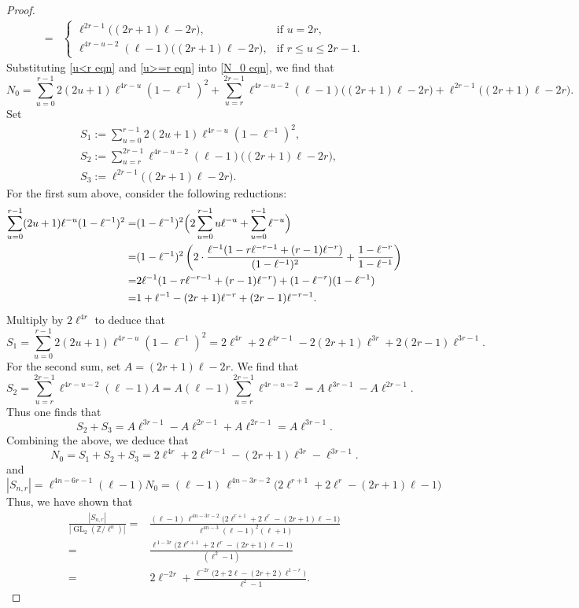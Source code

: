\documentclass[10pt,a4paper]{amsart}
\newcommand{\op}[1]{\operatorname{#1}}
\begin{document}
\begin{proof}
\begin{equation}
\begin{split}
=&\begin{cases}
\ell^{2r-1}\big((2r+1)\ell-2r\big), & \text{if }u=2r,\\
\ell^{4r-u-2}(\ell-1)\big((2r+1)\ell-2r\big), & \text{if }r\le u\le 2r-1.
\end{cases}
\end{split}
\end{equation}
Substituting \eqref{u<r eqn} and \eqref{u>=r eqn} into \eqref{N_0 eqn}, we find that
\[N_0=\sum_{u=0}^{r-1}2(2u+1) \ell^{4r-u}\left(1-\ell^{-1}\right)^2+\sum_{u=r}^{2r-1}\ell^{4r-u-2}(\ell-1)\big((2r+1)\ell-2r\big)+\ell^{2r-1}\big((2r+1)\ell-2r\big).\]
\noindent Set 
\[\begin{split}
&S_1:=\sum_{u=0}^{r-1}2(2u+1) \ell^{4r-u}\left(1-\ell^{-1}\right)^2,\\
&S_2:=\sum_{u=r}^{2r-1}\ell^{4r-u-2}(\ell-1)\big((2r+1)\ell-2r\big),\\
&S_3:=\ell^{2r-1}\big((2r+1)\ell-2r\big).
\end{split}\]
For the first sum above, consider the following reductions:
\[
\begin{split}\sum_{u=0}^{r-1} (2u+1)\ell^{-u}(1-\ell^{-1})^{2}
= &(1-\ell^{-1})^{2}\Bigl(2\sum_{u=0}^{r-1}u\ell^{-u}+\sum_{u=0}^{r-1}\ell^{-u}\Bigr)\\
= &(1-\ell^{-1})^{2}\left( 
2\cdot\frac{\ell^{-1}(1-r\ell^{-r-1}+(r-1)\ell^{-r})}{(1-\ell^{-1})^{2}}
+ \frac{1-\ell^{-r}}{1-\ell^{-1}}
\right)\\
= &2\ell^{-1}(1-r\ell^{-r-1}+(r-1)\ell^{-r}) + (1-\ell^{-r})(1-\ell^{-1})\\
= &1+\ell^{-1}-(2r+1)\ell^{-r}+(2r-1)\ell^{-r-1}.
\end{split}
\]
\noindent Multiply by $2 \ell^{4r}$ to deduce that
\[
S_1=\sum_{u=0}^{r-1}2(2u+1) \ell^{4r-u}\left(1-\ell^{-1}\right)^2= 2\ell^{4r} + 2\ell^{4r-1} - 2(2r+1)\ell^{3r} + 2(2r-1)\ell^{3r-1}.
\]
\noindent For the second sum, set $A = (2r+1)\ell - 2r$. We find that
\[
S_2=\sum_{u=r}^{2r-1} \ell^{4r-u-2} (\ell-1) A 
= A (\ell-1) \sum_{u=r}^{2r-1} \ell^{4r-u-2}=A \ell^{3r-1} - A \ell^{2r-1}.
\]
Thus one finds that
\[
S_2 + S_3 = A \ell^{3r-1} - A \ell^{2r-1} + A \ell^{2r-1} = A \ell^{3r-1}.
\]
Combining the above, we deduce that
\[
N_0= S_1 + S_2 + S_3 =  2\ell^{4r} + 2\ell^{4r-1} - (2r+1)\ell^{3r} - \ell^{3r-1}.
\]
and 
\[
|S_{n,r}| = \ell^{4n-6r-1}(\ell-1)N_0=(\ell-1)\, \ell^{4n-3r-2} \Big( 2 \ell^{r+1} + 2 \ell^r - (2r+1)\ell -1 \Big)
\]
Thus, we have shown that
\[\begin{split}
\frac{|S_{n,r}|}{|\op{GL}_2(\mathbb{Z}/\ell^n)|} 
=&\frac{(\ell-1)\,\ell^{4n-3r-2}\big(2\ell^{r+1}+2\ell^{r}-(2r+1)\ell-1\big)}
       {\ell^{4n-3}(\ell-1)^2(\ell+1)}\\
=&\frac{\ell^{\,1-3r}\big(2\ell^{r+1}+2\ell^{r}-(2r+1)\ell-1\big)}
       {(\ell^2-1)}\\
=&
2\ell^{-2r}
+
\frac{\ell^{-2r}\big(2+2\ell-(2r+2)\ell^{1-r}\big)}{\ell^{2}-1}.
\end{split}
\]
\end{proof}
\end{document}
